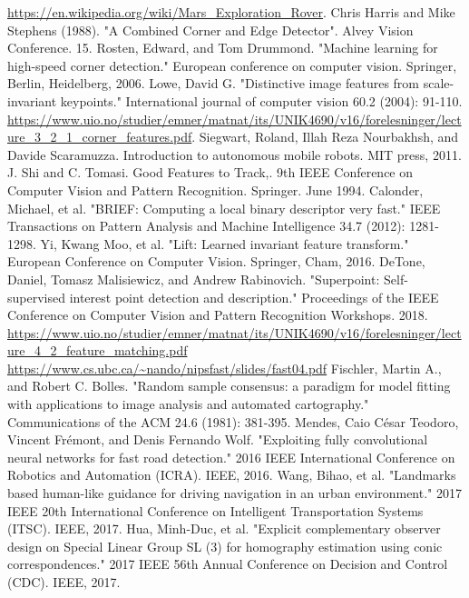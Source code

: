 \documentclass[aspectratio=169, compress]{beamer}
\begin{document}
	\begin{thebibliography}{00}
	 \url{https://en.wikipedia.org/wiki/Mars_Exploration_Rover}.
	  Chris Harris and Mike Stephens (1988). "A Combined Corner and Edge Detector". Alvey Vision Conference. 15.
	 Rosten, Edward, and Tom Drummond. "Machine learning for high-speed corner detection." European conference on computer vision. Springer, Berlin, Heidelberg, 2006.
	 Lowe, David G. "Distinctive image features from scale-invariant keypoints." International journal of computer vision 60.2 (2004): 91-110.
	 \url{https://www.uio.no/studier/emner/matnat/its/UNIK4690/v16/forelesninger/lecture_3_2_1_corner_features.pdf}.
	 Siegwart, Roland, Illah Reza Nourbakhsh, and Davide Scaramuzza. Introduction to autonomous mobile robots. MIT press, 2011.
	 J. Shi and C. Tomasi. Good Features to Track,. 9th IEEE Conference on Computer Vision and Pattern Recognition. Springer. June 1994. 
	 Calonder, Michael, et al. "BRIEF: Computing a local binary descriptor very fast." IEEE Transactions on Pattern Analysis and Machine Intelligence 34.7 (2012): 1281-1298.
	 Yi, Kwang Moo, et al. "Lift: Learned invariant feature transform." European Conference on Computer Vision. Springer, Cham, 2016.
	 DeTone, Daniel, Tomasz Malisiewicz, and Andrew Rabinovich. "Superpoint: Self-supervised interest point detection and description." Proceedings of the IEEE Conference on Computer Vision and Pattern Recognition Workshops. 2018.
	 \url{ https://www.uio.no/studier/emner/matnat/its/UNIK4690/v16/forelesninger/lecture_4_2_feature_matching.pdf}
	 \url{https://www.cs.ubc.ca/~nando/nipsfast/slides/fast04.pdf}
	 Fischler, Martin A., and Robert C. Bolles. "Random sample consensus: a paradigm for model fitting with applications to image analysis and automated cartography." Communications of the ACM 24.6 (1981): 381-395.
	 Mendes, Caio César Teodoro, Vincent Frémont, and Denis Fernando Wolf. "Exploiting fully convolutional neural networks for fast road detection." 2016 IEEE International Conference on Robotics and Automation (ICRA). IEEE, 2016.
	 Wang, Bihao, et al. "Landmarks based human-like guidance for driving navigation in an urban environment." 2017 IEEE 20th International Conference on Intelligent Transportation Systems (ITSC). IEEE, 2017.
	 Hua, Minh-Duc, et al. "Explicit complementary observer design on Special Linear Group SL (3) for homography estimation using conic correspondences." 2017 IEEE 56th Annual Conference on Decision and Control (CDC). IEEE, 2017.
	\end{thebibliography}	
	
\end{document}
